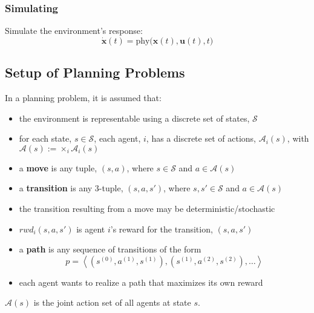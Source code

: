 \subsubsection{Simulating}
\begin{definition}
    Simulate the environment's response:
    \[
    \dot{\mathbf{x}}(t) = \text{phy}\big(\mathbf{x}(t), \mathbf{u}(t), t\big)
    \]
\end{definition}

\subsection{Setup of Planning Problems}
\begin{summary}
In a planning problem, it is assumed that:
    \begin{itemize}
        \item the environment is representable using a discrete set of states, $\mathcal{S}$
        \item for each state, $s \in \mathcal{S}$, each agent, $i$, has a discrete set of actions, $\mathcal{A}_i(s)$, with $\mathcal{A}(s) := \times_i \mathcal{A}_i(s)$
        \item a \textbf{move} is any tuple, $(s, a)$, where $s \in \mathcal{S}$ and $a \in \mathcal{A}(s)$
        \item a \textbf{transition} is any 3-tuple, $(s, a, s')$, where $s, s' \in \mathcal{S}$ and $a \in \mathcal{A}(s)$
        \item the transition resulting from a move may be deterministic/stochastic
        \item $rwd_i(s, a, s')$ is agent $i$'s reward for the transition, $(s, a, s')$
        \item a \textbf{path} is any sequence of transitions of the form
        \[
        p = \left\langle (s^{(0)}, a^{(1)}, s^{(1)}), (s^{(1)}, a^{(2)}, s^{(2)}), \ldots \right\rangle
        \]
        \item each agent wants to realize a path that maximizes its own reward
    \end{itemize}
\end{summary}

\begin{warning}
    $\mathcal{A}(s)$ is the joint action set of all agents at state $s$.
\end{warning}